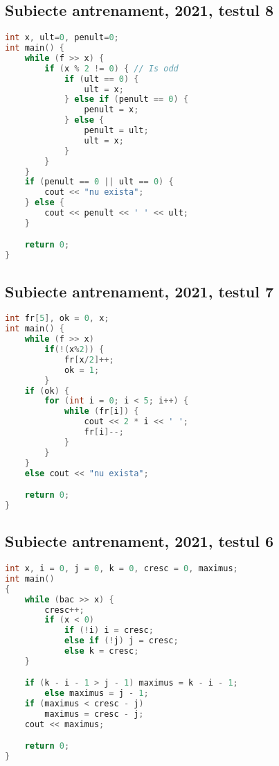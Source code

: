 \documentclass[10pt, a4paper, twocolumn]{article}
\begin{document}
\subsection*{Subiecte antrenament, 2021, testul 8}
\begin{lstlisting}[language=C++]
int x, ult=0, penult=0;
int main() {
    while (f >> x) {
        if (x % 2 != 0) { // Is odd
            if (ult == 0) {
                ult = x;
            } else if (penult == 0) {
                penult = x;
            } else {
                penult = ult;
                ult = x;
            }
        }
    }
    if (penult == 0 || ult == 0) {
        cout << "nu exista";
    } else {
        cout << penult << ' ' << ult;
    }

    return 0;
}
\end{lstlisting}
\vspace{0.5cm}

\subsection*{Subiecte antrenament, 2021, testul 7}
\begin{lstlisting}[language=C++]
int fr[5], ok = 0, x;
int main() {
    while (f >> x)
        if(!(x%2)) {
            fr[x/2]++;
            ok = 1;
        }
    if (ok) {
        for (int i = 0; i < 5; i++) {
            while (fr[i]) {
                cout << 2 * i << ' ';
                fr[i]--;
            }
        }
    }
    else cout << "nu exista";

    return 0;
}
\end{lstlisting}
\vspace{0.5cm}

\subsection*{Subiecte antrenament, 2021, testul 6}
\begin{lstlisting}[language=C++]
int x, i = 0, j = 0, k = 0, cresc = 0, maximus;
int main()
{
    while (bac >> x) {
        cresc++;
        if (x < 0)
            if (!i) i = cresc;
            else if (!j) j = cresc;
            else k = cresc;
    }

    if (k - i - 1 > j - 1) maximus = k - i - 1;
        else maximus = j - 1;
    if (maximus < cresc - j)
        maximus = cresc - j;
    cout << maximus;

    return 0;
}
\end{lstlisting}
\vspace{0.5cm}
\end{document}
